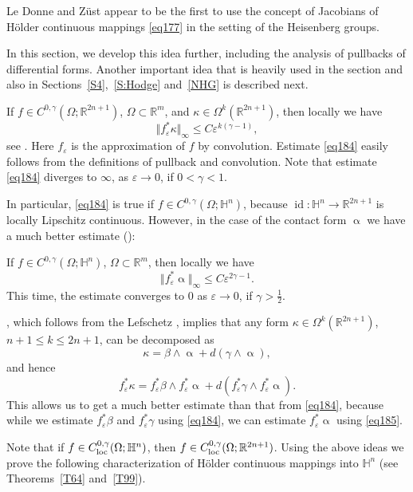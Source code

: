 \documentclass[intlimits,12pt,reqno]{amsart}
\newcommand{\bbbr}{\mathbb R}
\newcommand{\bbbh}{\mathbb H}
\newcommand{\R}{\mathbb R}
\newcommand{\eps}{\varepsilon}
\numberwithin{equation}{section}
\theoremstyle{definition}
\begin{document}
Le Donne and Z\"ust \cite{LZ} appear to be the first to use the concept of Jacobians of H\"older continuous mappings \eqref{eq177} in the setting of the Heisenberg groups. 

In this section, we develop this idea further, including the analysis of pullbacks of differential forms.
Another important idea that is heavily used in the section and also in Sections~\ref{S4},~\ref{S:Hodge} and~\ref{NHG} is described next.

If $f\in C^{0,\gamma}(\Omega;\R^{2n+1})$, $\Omega\subset\R^m$, and $\kappa\in\Omega^k(\R^{2n+1})$, then locally we have
\begin{equation}
\label{eq184}
\Vert f_\eps^*\kappa\Vert_\infty\leq C\eps^{k(\gamma-1)},
\end{equation}
see . Here $f_\eps$ is the approximation of $f$ by convolution. Estimate \eqref{eq184} easily follows from the definitions of pullback and convolution. Note that estimate \eqref{eq184} diverges to $\infty$, as $\eps\to 0$, if $0<\gamma<1$. 

In particular, \eqref{eq184} is true if $f\in C^{0,\gamma}(\Omega;\bbbh^n)$, because $\operatorname{id}:\bbbh^n\to\R^{2n+1}$ is locally Lipschitz continuous. However, in the case of the contact form $\upalpha$ we have a much better estimate ():

If $f\in C^{0,\gamma}(\Omega;\bbbh^n)$, $\Omega\subset\R^m$, then locally we have
\begin{equation}
\label{eq185}
\Vert f_\eps^*\upalpha\Vert_\infty\leq C\eps^{2\gamma-1}.
\end{equation}
This time, the estimate converges to $0$ as $\eps\to 0$, if $\gamma>\frac{1}{2}$.

, which follows from the Lefschetz , implies that any form $\kappa\in\Omega^k(\R^{2n+1})$, $n+1\leq k\leq 2n+1$, can be decomposed as
\begin{equation}
\label{eq186}
\kappa=\beta\wedge\upalpha+d(\gamma\wedge\upalpha),
\end{equation}
and hence 
$$
f^*_\eps\kappa=f_\eps^*\beta\wedge f_\eps^*\upalpha+d(f_\eps^*\gamma\wedge f^*_\eps\upalpha).
$$
This allows us to get a much better estimate than that from \eqref{eq184}, because while we estimate $f^*_\eps\beta$ and $f_\eps^*\gamma$ using \eqref{eq184}, we can estimate $f_\eps^*\upalpha$ using \eqref{eq185}.


Note that if $f\in C^{0,\gamma}_{\rm loc}(\Omega;\bbbh^n)$, then $f\in C^{0,\gamma}_{\rm loc}(\Omega;\bbbr^{2n+1})$.
Using the above ideas we prove the following characterization of H\"older continuous mappings into $\bbbh^n$ (see Theorems~\ref{T64} and~\ref{T99}).
\end{document}
